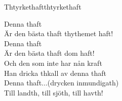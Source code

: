 \begin{song}{Thtyrkethaft}{thtyrkethaft}
\begin{vers}
Denna thaft\\
Är den bästa thaft thythemet haft!\\
Denna thaft\\
Är den bästa thaft dom haft!\\
Och den som inte har nån kraft\\
Han dricka thkall av denna thaft\\
Denna thaft...(drycken inmundigath)\\
Till landth, till sjöth, till havth!\\
\end{vers}
\end{song}
